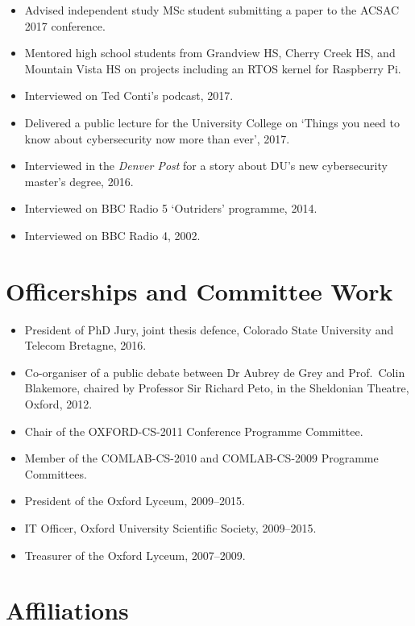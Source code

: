 \documentclass[12pt,twoside,letterpaper]{article}
\begin{document}
\begin{itemize}
    \item Advised independent study MSc student submitting a paper to the
        ACSAC 2017 conference.
    \item Mentored high school students from Grandview HS, Cherry Creek HS,
        and Mountain Vista HS on projects including an RTOS kernel for
        Raspberry Pi.
    \item Interviewed on Ted Conti's podcast, 2017.
    \item Delivered a public lecture for the University College on `Things
        you need to know about cybersecurity now more than ever', 2017.
    \item Interviewed in the \emph{Denver Post} for a story about DU's new
        cybersecurity master's degree, 2016.
    \item Interviewed on BBC Radio 5 `Outriders' programme, 2014.
    \item Interviewed on BBC Radio 4, 2002.
\end{itemize}

\vspace{-7mm}
\section*{Officerships and Committee Work}
\vspace{-2mm}

\begin{itemize}
    \item President of PhD Jury, joint thesis defence, Colorado
        State University and Telecom Bretagne, 2016.
	\item Co-organiser of a public debate between Dr Aubrey de Grey
		and Prof.\ Colin Blakemore, chaired by Professor Sir Richard
		Peto, in the Sheldonian Theatre, Oxford, 2012.
	\item Chair of the OXFORD-CS-2011 Conference Programme Committee.
	\item Member of the COMLAB-CS-2010 and COMLAB-CS-2009 Programme
		Committees.
	\item President of the Oxford Lyceum, 2009--2015.
	\item IT Officer, Oxford University Scientific Society, 2009--2015.
	\item Treasurer of the Oxford Lyceum, 2007--2009.
\end{itemize}

\vspace{-7mm}
\section*{Affiliations}
\vspace{-2mm}
\end{document}

